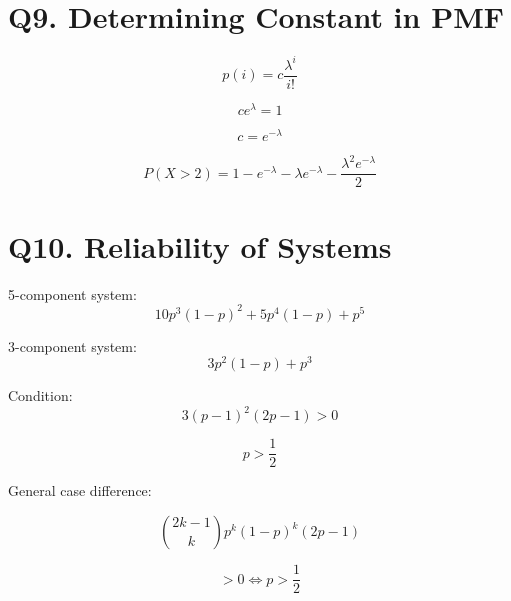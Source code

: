 \documentclass[12pt]{article}
\begin{document}
\section*{Q9. Determining Constant in PMF}

\[
p(i)=c\frac{\lambda^i}{i!}
\]

\[
c e^{\lambda}=1
\]

\[
c=e^{-\lambda}
\]

\[
P(X>2)=1-e^{-\lambda}-\lambda e^{-\lambda}-\frac{\lambda^2 e^{-\lambda}}{2}
\]

\section*{Q10. Reliability of Systems}

5-component system:
\[
10p^3(1-p)^2+5p^4(1-p)+p^5
\]

3-component system:
\[
3p^2(1-p)+p^3
\]

Condition:
\[
3(p-1)^2(2p-1)>0
\]

\[
p>\frac{1}{2}
\]

General case difference:

\[
\binom{2k-1}{k}p^k(1-p)^k(2p-1)
\]

\[
>0 \iff p>\frac{1}{2}
\]
\end{document}
